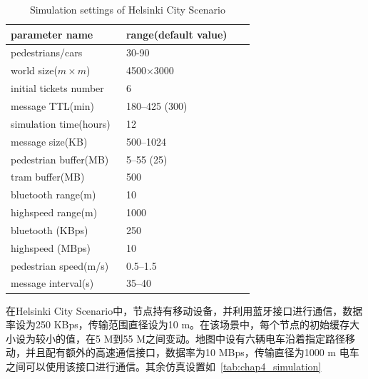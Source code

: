 \begin{table}
\centering
\caption{Simulation settings of Helsinki City Scenario}
\label{tab:chap4_simulation_helsinki}
\begin{tabular}{
p{0.45\linewidth}<{\centering}
p{0.5\linewidth}<{\centering}
}
\hline
\textbf{parameter name} & \textbf{range(default value)} \\
\hline
pedestrians/cars & 30-90  \\
world size($m\times m$) & 4500$\times$3000  \\
initial tickets number & 6 \\
message TTL(min) & 180--425 (300) \\
simulation time(hours) & 12 \\
message size(KB) & 500--1024 \\
pedestrian buffer(MB) & 5--55 (25) \\
tram buffer(MB) & 500 \\
bluetooth range(m) & 10 \\
highspeed range(m) & 1000 \\ 
bluetooth (KBps) & 250 \\
highspeed (MBps) & 10 \\ 
pedestrian speed(m/s) & 0.5--1.5  \\
message interval(s) & 35--40 \\
\hline
\end{tabular}
\end{table}

在Helsinki City Scenario\cite{Keranen2010}中，节点持有移动设备，并利用蓝牙接口进行通信，数据率设为250 KBps，传输范围直径设为10 m。在该场景中，每个节点的初始缓存大小设为较小的值，在5 M到55 M之间变动。地图中设有六辆电车沿着指定路径移动，并且配有额外的高速通信接口，数据率为10 MBps，传输直径为1000 m 电车之间可以使用该接口进行通信。其余仿真设置如\tablename~\ref{tab:chap4_simulation}

